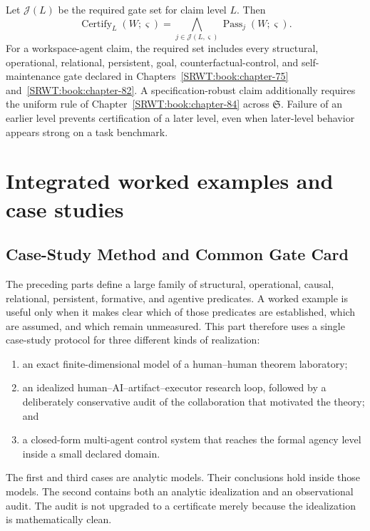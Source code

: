 Let \(\mathcal J(L)\) be the required gate set for claim level \(L\). Then
\[
\boxed{
\operatorname{Certify}_L(W;\varsigma)
=
\bigwedge_{j\in\mathcal J(L,\varsigma)}
\operatorname{Pass}_j(W;\varsigma).
}
\]
For a workspace-agent claim, the required set includes every structural,
operational, relational, persistent, goal, counterfactual-control, and
self-maintenance gate declared in Chapters~\ref{SRWT:book:chapter-75} and~\ref{SRWT:book:chapter-82}. A specification-robust
claim additionally requires the uniform rule of Chapter~\ref{SRWT:book:chapter-84} across
\(\mathfrak S\). Failure of an earlier level
prevents certification of a later level, even when later-level behavior appears
strong on a task benchmark.


\chapter{Integrated worked examples and case studies}\label{SRWT:book:chapter-88}


\section{Case-Study Method and Common Gate Card}

The preceding parts define a large family of structural, operational, causal,
relational, persistent, formative, and agentive predicates. A worked example
is useful only when it makes clear which of those predicates are established,
which are assumed, and which remain unmeasured. This part therefore uses a
single case-study protocol for three different kinds of realization:
\begin{enumerate}
\item an exact finite-dimensional model of a human--human theorem laboratory;
\item an idealized human--AI--artifact--executor research loop, followed by a
 deliberately conservative audit of the collaboration that motivated the
 theory; and
\item a closed-form multi-agent control system that reaches the formal agency
 level inside a small declared domain.
\end{enumerate}
The first and third cases are analytic models. Their conclusions hold inside
those models. The second contains both an analytic idealization and an
observational audit. The audit is not upgraded to a certificate merely because
the idealization is mathematically clean.

